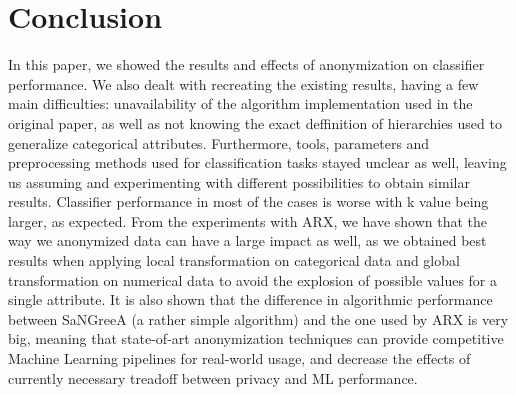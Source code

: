 \documentclass{article}
\begin{document}
\section{Conclusion}
In this paper, we showed the results and effects of anonymization on classifier performance. We also dealt with recreating the existing results, having a few main difficulties: unavailability of the algorithm implementation used in the original paper, as well as not knowing the exact deffinition of hierarchies used to generalize categorical attributes. Furthermore, tools, parameters and preprocessing methods used for classification tasks stayed unclear as well, leaving us assuming and experimenting with different possibilities to obtain similar results. Classifier performance in most of the cases is worse with k value being larger, as expected. From the experiments with ARX, we have shown that the way we anonymized data can have a large impact as well, as we obtained best results when applying local transformation on categorical data and global transformation on numerical data to avoid the explosion of possible values for a single attribute. It is also shown that the difference in algorithmic performance between SaNGreeA (a rather simple algorithm) and the one used by ARX is very big, meaning that state-of-art anonymization techniques can provide competitive Machine Learning pipelines for real-world usage, and decrease the effects of currently necessary treadoff between privacy and ML performance. 
\newpage



\end{document}
